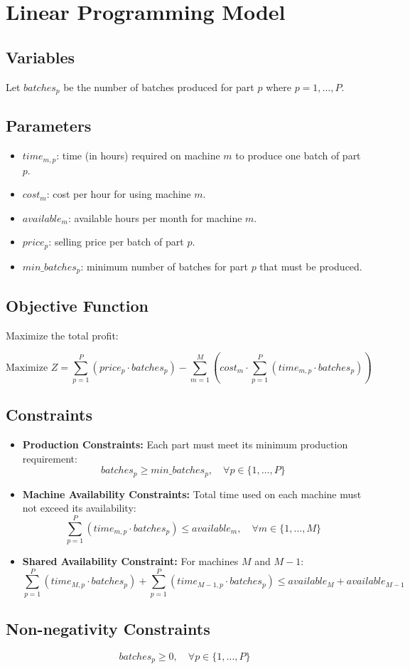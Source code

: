 \documentclass{article}
\begin{document}
\section*{Linear Programming Model}

\subsection*{Variables}
Let \( batches_{p} \) be the number of batches produced for part \( p \) where \( p = 1, \ldots, P \).

\subsection*{Parameters}
\begin{itemize}
    \item \( time_{m,p} \): time (in hours) required on machine \( m \) to produce one batch of part \( p \).
    \item \( cost_{m} \): cost per hour for using machine \( m \).
    \item \( available_{m} \): available hours per month for machine \( m \).
    \item \( price_{p} \): selling price per batch of part \( p \).
    \item \( min\_batches_{p} \): minimum number of batches for part \( p \) that must be produced.
\end{itemize}

\subsection*{Objective Function}
Maximize the total profit:

\[
\text{Maximize } Z = \sum_{p=1}^{P} (price_{p} \cdot batches_{p}) - \sum_{m=1}^{M} \left( cost_{m} \cdot \sum_{p=1}^{P} (time_{m,p} \cdot batches_{p}) \right)
\]

\subsection*{Constraints}
\begin{itemize}
    \item \textbf{Production Constraints:} Each part must meet its minimum production requirement:
    \[
    batches_{p} \geq min\_batches_{p}, \quad \forall p \in \{1, \ldots, P\}
    \]

    \item \textbf{Machine Availability Constraints:} Total time used on each machine must not exceed its availability:
    \[
    \sum_{p=1}^{P} (time_{m,p} \cdot batches_{p}) \leq available_{m}, \quad \forall m \in \{1, \ldots, M\}
    \]

    \item \textbf{Shared Availability Constraint:} For machines \( M \) and \( M-1 \):
    \[
    \sum_{p=1}^{P} (time_{M,p} \cdot batches_{p}) + \sum_{p=1}^{P} (time_{M-1,p} \cdot batches_{p}) \leq available_{M} + available_{M-1}
    \]
\end{itemize}

\subsection*{Non-negativity Constraints}
\[
batches_{p} \geq 0, \quad \forall p \in \{1, \ldots, P\}
\]
\end{document}

